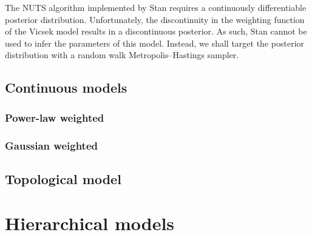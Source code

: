 The NUTS algorithm implemented by Stan requires a continuously differentiable posterior
distribution. Unfortunately, the discontinuity in the weighting function of the
Vicsek model results in a discontinuous posterior. As such, Stan cannot be used to infer
the parameters of this model. Instead, we shall target the posterior distribution with a
random walk Metropolis--Hastings sampler.


\subsection{Continuous models}

\subsubsection{Power-law weighted}

\subsubsection{Gaussian weighted}

\subsection{Topological model}

\section{Hierarchical models}
